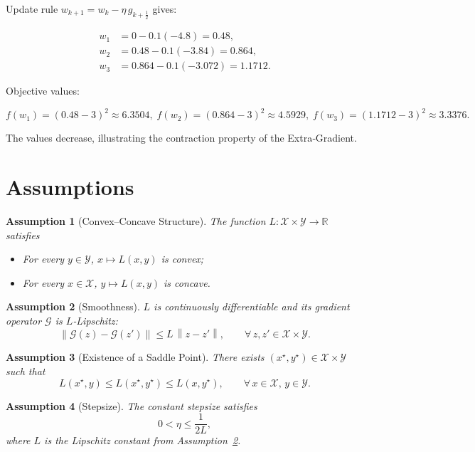 \documentclass{article}
\newtheorem{assumption}{Assumption}
\newcommand{\R}{\mathbb{R}}
\newcommand{\norm}[1]{\left\|#1\right\|}
\newcommand{\G}{\mathcal{G}}
\begin{document}
Update rule $w_{k+1}=w_k-\eta\,g_{k+\frac12}$ gives:

\[
\begin{aligned}
w_1 &= 0-0.1(-4.8)=0.48,\\
w_2 &= 0.48-0.1(-3.84)=0.864,\\
w_3 &= 0.864-0.1(-3.072)=1.1712 .
\end{aligned}
\]

Objective values:

\[
f(w_1)= (0.48-3)^2\approx6.3504,\; 
f(w_2)= (0.864-3)^2\approx4.5929,\;
f(w_3)= (1.1712-3)^2\approx3.3376 .
\]

The values decrease, illustrating the contraction property of the Extra‑Gradient.

\section*{Assumptions}
\begin{assumption}[Convex–Concave Structure]\label{as:cc}
The function $L:\mathcal{X}\times\mathcal{Y}\rightarrow\R$ satisfies
\begin{itemize}[noitemsep,topsep=0pt]
\item For every $y\in\mathcal{Y}$, $x\mapsto L(x,y)$ is convex;
\item For every $x\in\mathcal{X}$, $y\mapsto L(x,y)$ is concave.
\end{itemize}
\end{assumption}

\begin{assumption}[Smoothness]\label{as:smooth}
$L$ is continuously differentiable and its gradient operator $\G$ is $L$‑Lipschitz:
\[
\norm{\G(z)-\G(z')}\le L\,\norm{z-z'},\qquad\forall\,z,z'\in\mathcal{X}\times\mathcal{Y}.
\]
\end{assumption}

\begin{assumption}[Existence of a Saddle Point]\label{as:saddle}
There exists $(x^\star,y^\star)\in\mathcal{X}\times\mathcal{Y}$ such that
\[
L(x^\star,y)\le L(x^\star,y^\star)\le L(x,y^\star),\qquad\forall\,x\in\mathcal{X},\,y\in\mathcal{Y}.
\]
\end{assumption}

\begin{assumption}[Stepsize]\label{as:stepsize}
The constant stepsize satisfies
\[
0<\eta\le \frac{1}{2L},
\]
where $L$ is the Lipschitz constant from Assumption~\ref{as:smooth}.
\end{assumption}
\end{document}
